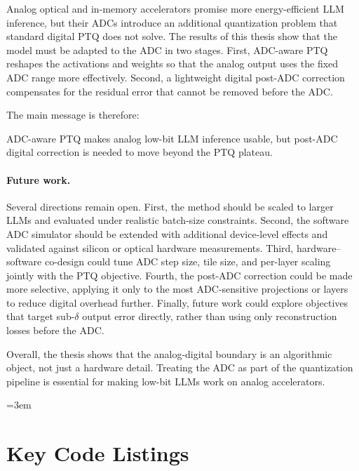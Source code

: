 \documentclass[a4paper,11pt,oneside]{article}
\theoremstyle{breakstyle}
\begin{document}
  Analog optical and in-memory accelerators promise more energy-efficient
  LLM inference, but their ADCs introduce an additional quantization
  problem that standard digital PTQ does not solve.  The results of this
  thesis show that the model must be adapted to the ADC in two stages.
  First, ADC-aware PTQ reshapes the activations and weights so that the
  analog output uses the fixed ADC range more effectively.  Second, a
  lightweight digital post-ADC correction compensates for the residual
  error that cannot be removed before the ADC.

  The main message is therefore:

  ADC-aware PTQ makes analog low-bit LLM inference usable, but
  post-ADC digital correction is needed to move beyond the PTQ plateau.

  \paragraph{Future work.}

  Several directions remain open.  First, the method should be scaled to
  larger LLMs and evaluated under realistic batch-size constraints.
  Second, the software ADC simulator should be extended with additional
  device-level effects and validated against silicon or optical hardware
  measurements.  Third, hardware--software co-design could tune ADC step
  size, tile size, and per-layer scaling jointly with the PTQ objective.
  Fourth, the post-ADC correction could be made more selective, applying
  it only to the most ADC-sensitive projections or layers to reduce
  digital overhead further.  Finally, future work could explore
  objectives that target sub-$\delta$ output error directly, rather than
  using only reconstruction losses before the ADC.

  Overall, the thesis shows that the analog-digital boundary is an
  algorithmic object, not just a hardware detail.  Treating the ADC as
  part of the quantization pipeline is essential for making low-bit LLMs
  work on analog accelerators.

  \newpage
  {\emergencystretch=3em \sloppy
  \printbibliography
  }

  \clearpage
  \appendix

  \section{Key Code Listings}
  \label{app:code}
\end{document}
